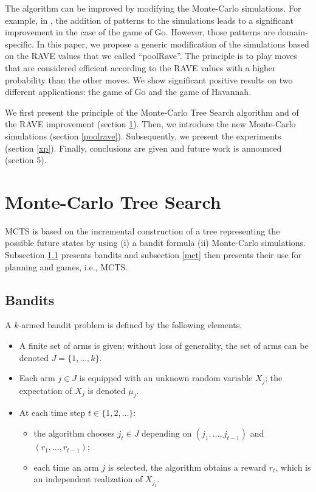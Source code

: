 \documentclass{llncs}
\begin{document}
The algorithm can be improved by modifying the Monte-Carlo simulations. For example, in \cite{mogofpu}, the addition of patterns to the simulations leads to a significant improvement in the case of the game of Go. However, those patterns are domain-specific. In this paper, we propose a generic modification of the simulations based on the RAVE values that we called ``poolRave''. The principle is to play moves that are considered efficient according to the RAVE values with a higher probability than the other moves. We show significant positive results on two different applications: the game of Go and the game of Havannah.


We first present the principle of the Monte-Carlo Tree Search algorithm and of the RAVE improvement (section \ref{MCTS}). Then, we introduce the new Monte-Carlo simulations (section \ref{poolrave}). Subsequently, we present the experiments (section \ref{xp}). Finally, conclusions are given and future work is announced (section 5).


\section{Monte-Carlo Tree Search}\label{MCTS}

MCTS is based on the incremental construction of a tree representing the possible future states by using (i) a bandit formula (ii) Monte-Carlo simulations. Subsection \ref{bdts} presents bandits and subsection \ref{mct} then presents their use for planning and games, i.e., MCTS.

\subsection{Bandits}\label{bdts}

A $k$-armed bandit problem is defined by the following elements.
\begin{itemize}
        \item A finite set of arms is given; without loss of generality, the set of arms can be denoted $J=\{1,\dots,k\}$.
        \item Each arm $j\in J$ is equipped with an unknown random variable $X_j$; the expectation of $X_j$ is denoted $\mu_j$.
        \item At each time step $t\in \{1,2,\dots\}$:
	\begin{itemize}
		\item the algorithm chooses $j_t\in J$ depending on $(j_1,\dots,j_{t-1})$ and $(r_1,\dots,r_{t-1})$;
        	\item each time an arm $j$ is selected, the algorithm obtains a reward $r_t$, which is an independent realization of $X_{j_t}$.
	\end{itemize}
\end{itemize}
\end{document}
